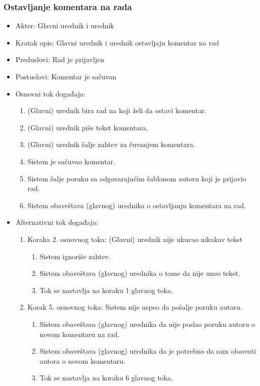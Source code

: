 \documentclass[a4paper]{article}
\begin{document}
\subsubsection{Ostavljanje komentara na rada}
\begin{itemize}
    \item Akter: Glavni urednik i urednik
    \item Kratak opis: Glavni urednik i urednik ostavljaju komentar na rad
    \item Preduslovi: Rad je prijavljen
    \item Postuslovi: Komentar je sačuvan
    \item Osnovni tok događaja:
        \begin{enumerate}
           \item (Glavni) urednik bira rad na koji želi da ostavi komentar.
           \item (Glavni) urednik piše tekst komentara.
           \item (Glavni) urednik šalje zahtev za čuvanjem komentara.
           \item Sistem je sačuvao komentar.
           \item Sistem šalje poruku sa odgovarajućim šablonom autoru koji je prijavio rad.
           \item Sistem obaveštava (glavnog) urednika o ostavljanju komentara na rad.
        \end{enumerate}
    \item Alternativni tok događaja:
        \begin{enumerate}
            \item Koraka 2. osnovnog toka: (Glavni) urednik nije ukucao nikakav tekst
            \begin{enumerate}
                \item Sistem ignoriše zahtev.
                \item Sistem obaveštava (glavnog) urednika o tome da nije uneo tekst.
                \item Tok se nastavlja na koraku 1 glavnog toka.
            \end{enumerate}
            \item Korak 5. osnovnog toka: Sistem nije uspeo da pošalje poruku autoru.
            \begin{enumerate}
                \item Sistem obaveštava (glavnog) urednika da nije poslao poruku autoru o novom komentaru na rad.
                \item Sistem obaveštava (glavnog) urednika da je potrebno da sam obavesti autora o novom komentaru.
                \item Tok se nastavlja na koraku 6 glavnog toka.
            \end{enumerate}
        \end{enumerate}
\end{itemize}
\end{document}
